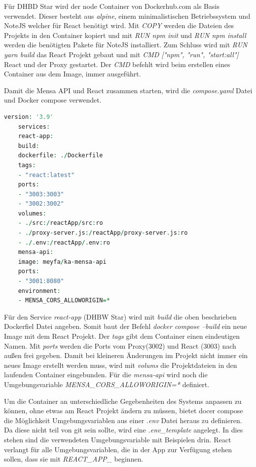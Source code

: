 Für DHBD Star wird der node Container von Dockerhub.com als Basis verwendet. Dieser besteht aus \emph{alpine}, einem minimalistischen Betriebssystem und NoteJS welcher für React benötigt wird.
Mit \emph{COPY} werden die Dateien des Projekts in den Container kopiert und mit \emph{RUN npm init} und \emph{RUN npm install} werden die benötigten Pakete für NoteJS installiert.
Zum Schluss wird mit \emph{RUN yarn build} das React Projekt gebaut und mit \emph{CMD ["npm", "run", "start:all"]} React und der Proxy gestartet. Der \emph{CMD} befehlt wird beim erstellen eines Container aus dem Image, immer ausgeführt. 

Damit die Mensa API und React zusammen starten, wird die \emph{compose.yaml} Datei und Docker compose verwendet.

\begin{lstlisting}[language=vhdl,
	frame=single,           % Ein Rahmen um den Code
	framexleftmargin=15pt,  % Rahmen link von den Zahlen
	style=algoBericht,
	label={composefile},
	captionpos=b           % Caption unter den Code setzen
	caption={compose.yaml für DHBW-Star}]
	version: '3.9'
	services:
	react-app:
	build:
	dockerfile: ./Dockerfile
	tags:
	- "react:latest"
	ports:
	- "3003:3003"
	- "3002:3002"
	volumes:
	- ./src:/reactApp/src:ro
	- ./proxy-server.js:/reactApp/proxy-server.js:ro
	- ./.env:/reactApp/.env:ro
	mensa-api:
	image: meyfa/ka-mensa-api
	ports:
	- "3001:8080"
	environment:
	- MENSA_CORS_ALLOWORIGIN=*
\end{lstlisting}

Für den Service \emph{react-app} (DHBW Star) wird mit \emph{build} die oben beschrieben Dockerfiel Datei angeben. Somit baut der Befehl \emph{docker compose --build} ein neue Image mit dem React Projekt.
Der \emph{tags} gibt dem Container einen eindeutigen Namen.
Mit \emph{ports} werden die Ports vom Proxy(3002) und React (3003) nach außen frei gegeben.
Damit bei kleineren Änderungen im Projekt nicht immer ein neues Image erstellt werden muss, wird mit \emph{volums} die Projektdateien in den laufenden Container eingebunden.
Für die \emph{mensa-api} wird noch die Umgebungsvariable \emph{MENSA\_CORS\_ALLOWORIGIN=*} definiert.

Um die Container an unterschiedliche Gegebenheiten des Systems anpassen zu können, ohne etwas am React Projekt ändern zu müssen, bietet docer compose die Möglichkeit Umgebungsvariablen aus einer \emph{.env} Datei heraus zu definieren.
Da diese nicht teil von git sein sollte, wird eine \emph{.env\_template} angelegt. In dies stehen sind die verwendeten Umgebungsvariable mit Beispielen drin.
React verlangt für alle Umgebungsvariablen, die in der App zur Verfügung stehen sollen, dass sie mit \emph{REACT\_APP\_} beginnen.

